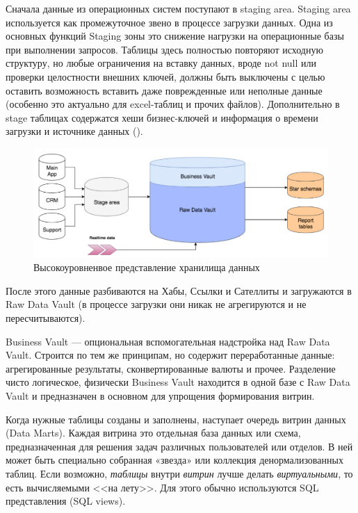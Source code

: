 \documentclass[%
	11pt,
	a4paper,
	utf8,
		]{article}
\begin{document}
Сначала данные из операционных систем поступают в staging area. Staging area используется как промежуточное звено в процессе загрузки данных. Одна из основных функций Staging зоны это снижение нагрузки на операционные базы при выполнении запросов. Таблицы здесь полностью повторяют исходную структуру, но любые ограничения на вставку данных, вроде not null или проверки целостности внешних ключей, должны быть выключены с целью оставить возможность вставить даже поврежденные или неполные данные (особенно это актуально для excel-таблиц и прочих файлов). Дополнительно в stage таблицах содержатся хеши бизнес-ключей и информация о времени загрузки и источнике данных ().

\begin{figure}[h]
	\centering
	\includegraphics[scale=0.65]{figures/dwh_data_vault.png}
	\caption{ Высокоуровненвое представление хранилища данных }\label{fig:dwh_data_vault}
\end{figure}

После этого данные разбиваются на Хабы, Ссылки и Сателлиты и загружаются в Raw Data Vault (в процессе загрузки они никак не агрегируются и не пересчитываются).

Business Vault — опциональная вспомогательная надстройка над Raw Data Vault. Строится по тем же принципам, но содержит переработанные данные: агрегированные результаты, сконвертированные валюты и прочее. Разделение чисто логическое, физически Business Vault находится в одной базе с Raw Data Vault и предназначен в основном для упрощения формирования витрин.

Когда нужные таблицы созданы и заполнены, наступает очередь витрин данных (Data Marts). Каждая витрина это отдельная база данных или схема, предназначенная для решения задач различных пользователей или отделов. В ней может быть специально собранная «звезда» или коллекция денормализованных таблиц. Если возможно, \emph{таблицы} внутри \emph{витрин} лучше делать \emph{виртуальными}, то есть вычисляемыми <<на лету>>. Для этого обычно используются SQL представления (SQL views).
\end{document}
